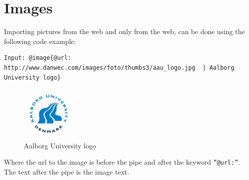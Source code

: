 \section{Images}
Importing pictures from the web and only from the web, can be done using the following code example:

\begin{lstlisting}[frame=single]
Input: @image{@url: http://www.danwec.com/images/foto/thumbs3/aau_logo.jpg  | Aalborg University logo}
\end{lstlisting}

\begin{figure}[! h]
\centering
	 \includegraphics[width=100px]{images/aau_logo.jpg}
		 \caption{Aalborg University logo}	
	\label{fig:Imageimport}
\end{figure}

Where the url to the image is before the pipe and after the keyword \texttt{''@url:''}. The text after the pipe is the image text.